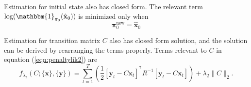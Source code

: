 \documentclass[fleqn]{article}
\let\oldref\ref
\renewcommand{\ref}[1]{(\oldref{#1})}
\newcommand{\T}{^{\ensuremath{\mathsf{T}}}}           %
\begin{document}
Estimation for initial state also has closed form. The relevant term $\log(\mathbbm{1}_{\mathbf{\pi}_0}(\hat{\mathbf{x}}_0))$ is minimized only when
\begin{equation*}\label{eq:updatepi}
\mathbf{\pi}_0^{\text{new}} = \hat{\mathbf{x}}_0
\end{equation*}

Estimation for transition matrix $C$ also has closed form solution, and the solution can be derived by rearranging the terms properly. Terms relevant to $C$ in equation \ref{eqn:penaltylik2} are
\begin{equation}\label{eq:penaltylik1}
f_{\lambda_2}(C;\{\mathbf{x}\},\{\mathbf{y}\}) = \sum\limits_{t=1}^{T}\left(\frac{1}{2}[\mathbf{y}_t-C\mathbf{x}_t]^{\T}R^{-1}[\mathbf{y}_t-C\mathbf{x}_t]\right)+\lambda_2 \|C\|_2.
\end{equation}
\end{document}
